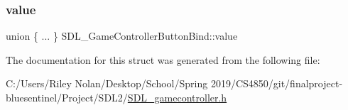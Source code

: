 \subsubsection{\texorpdfstring{value}{value}}
{\footnotesize\ttfamily union \{ ... \}   S\+D\+L\+\_\+\+Game\+Controller\+Button\+Bind\+::value}



The documentation for this struct was generated from the following file\+:\begin{DoxyCompactItemize}
\item 
C\+:/\+Users/\+Riley Nolan/\+Desktop/\+School/\+Spring 2019/\+C\+S4850/git/finalproject-\/bluesentinel/\+Project/\+S\+D\+L2/\mbox{\hyperlink{_s_d_l__gamecontroller_8h}{S\+D\+L\+\_\+gamecontroller.\+h}}\end{DoxyCompactItemize}
